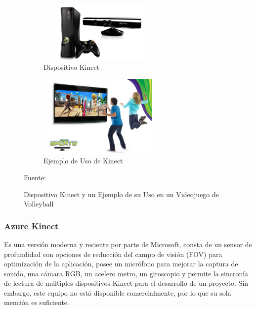 \begin{figure}
	\centering
	\begin{subfigure}{.5\textwidth}
		\centering
		\includegraphics[width=6cm,height=3cm,]{./Images/kinectex.jpg}
		\caption{Dispositivo Kinect}
		\label{kinectex}
	\end{subfigure}%
	\begin{subfigure}{0.5\textwidth}
		\centering
		\includegraphics[width=6cm,height=4cm,]{./Images/kinectexuse.jpg}
		\caption{Ejemplo de Uso de Kinect}
		\label{kinectexuse}
	\end{subfigure}
	\caption{Dispositivo Kinect y un Ejemplo de su Uso en un Videojuego de Volleyball}
	\label{kinectExample}
	\footnotesize Fuente: \cite{kinectex} \cite{kinectexuse}
\end{figure}

\subsubsection{Azure Kinect}

Es una versión moderna y reciente por parte de Microsoft, consta de un sensor de profundidad con opciones de reducción del campo de visión (FOV) para optimización de la aplicación, posee un micrófono para mejorar la captura de sonido, una cámara RGB, un acelero metro, un giroscopio y permite la sincronía de lectura de múltiples dispositivos Kinect para el desarrollo de un proyecto. Sin embargo, este equipo no está disponible comercialmente, por lo que su sola mención es suficiente.

